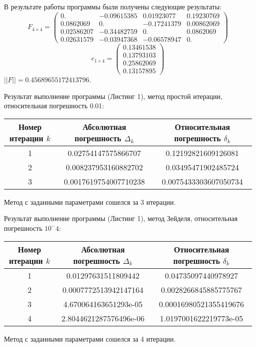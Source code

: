 \documentclass [12pt]{article}
\begin{document}
В результате работы программы были получены следующие результаты: 
\[
    F_{4\times 4} = 
    \begin{pmatrix}
      0. & -0.09615385 & 0.01923077 & 0.19230769\\
      0.0862069 & 0. & -0.17241379 & 0.00862069\\
      0.02586207 & -0.34482759 & 0. & 0.0862069\\
      0.02631579 & -0.03947368 & -0.06578947 & 0.
    \end{pmatrix}
\]
\[
  c_{1\times 4} = 
  \begin{pmatrix}
    0.13461538 \\
    0.13793103 \\
    0.25862069 \\
    0.13157895 
  \end{pmatrix}
\]
$ ||F|| = 0.45689655172413796$.

Результат выполнение программы (Листинг 1), метод простой итерации, относительная погрешность 0.01:
\begin{table}[H]
\begin{center}
\begin{tabular}{|c|c|c|}
\hline
Номер итерации $k$ & Абсолютная погрешность $\Delta_{k}$ & Относительная погрешность $\delta_{k}$ \\ \hline
1 & 0.02754147575866707 & 0.12192821609126081  \\ \hline
2 & 0.008237953160882702 & 0.03495471902485724  \\ \hline
3 & 0.0017619754007710238 & 0.0075433303607050734  \\ \hline
\end{tabular}
\end{center}
\end{table} 
Метод с заданными параметрами сошелся за 3 итерации.

Результат выполнение программы (Листинг 1), метод Зейделя, относительная погрешность $10^-4$:
\begin{table}[H]
\begin{center}
\begin{tabular}{|c|c|c|}
\hline
Номер итерации $k$ & Абсолютная погрешность $\Delta_{k}$ & Относительная погрешность $\delta_{k}$ \\ \hline
1 & 0.01297631511809442 & 0.04735097440978927  \\ \hline
2 & 0.0007772513942147164 & 0.0028266845885775767  \\ \hline
3 & 4.670064163651293e-05 & 0.00016980521355419676  \\ \hline
4 & 2.8044621287576496e-06 & 1.0197001622219773e-05  \\ \hline
\end{tabular}
\end{center}
\end{table}
Метод с заданными параметрами сошелся за 4 итерации.
\end{document}
